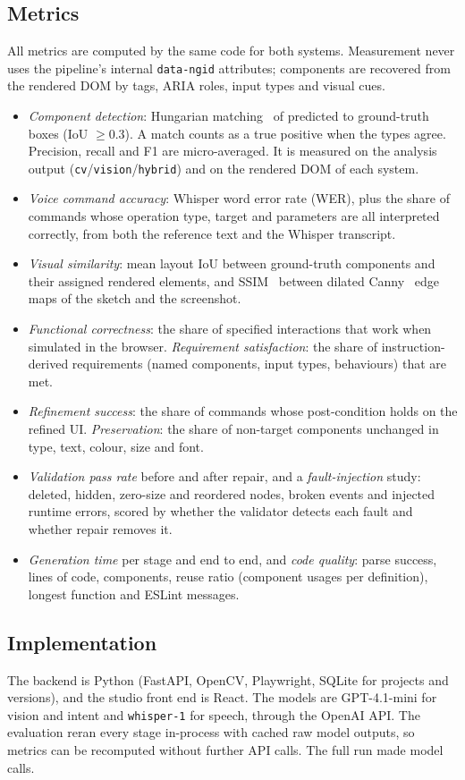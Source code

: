 \subsection{Metrics}
All metrics are computed by the same code for both systems. Measurement never uses the pipeline's internal \texttt{data-ngid} attributes; components are recovered from the rendered DOM by tags, ARIA roles, input types and visual cues.
\begin{itemize}
\item \textit{Component detection}: Hungarian matching~\cite{kuhn1955hungarian} of predicted to ground-truth boxes (IoU $\geq 0.3$). A match counts as a true positive when the types agree. Precision, recall and F1 are micro-averaged. It is measured on the analysis output (\texttt{cv}/\texttt{vision}/\texttt{hybrid}) and on the rendered DOM of each system.
\item \textit{Voice command accuracy}: Whisper word error rate (WER), plus the share of commands whose operation type, target and parameters are all interpreted correctly, from both the reference text and the Whisper transcript.
\item \textit{Visual similarity}: mean layout IoU between ground-truth components and their assigned rendered elements, and SSIM~\cite{wang2004ssim} between dilated Canny~\cite{canny1986edge} edge maps of the sketch and the screenshot.
\item \textit{Functional correctness}: the share of specified interactions that work when simulated in the browser. \textit{Requirement satisfaction}: the share of instruction-derived requirements (named components, input types, behaviours) that are met.
\item \textit{Refinement success}: the share of commands whose post-condition holds on the refined UI. \textit{Preservation}: the share of non-target components unchanged in type, text, colour, size and font.
\item \textit{Validation pass rate} before and after repair, and a \textit{fault-injection} study: deleted, hidden, zero-size and reordered nodes, broken events and injected runtime errors, scored by whether the validator detects each fault and whether repair removes it.
\item \textit{Generation time} per stage and end to end, and \textit{code quality}: parse success, lines of code, components, reuse ratio (component usages per definition), longest function and ESLint messages.
\end{itemize}

\subsection{Implementation}
The backend is Python (FastAPI, OpenCV, Playwright, SQLite for projects and versions), and the studio front end is React. The models are GPT-4.1-mini for vision and intent and \texttt{whisper-1} for speech, through the OpenAI API. The evaluation reran every stage in-process with cached raw model outputs, so metrics can be recomputed without further API calls. The full run made \ApiCalls{} model calls.
